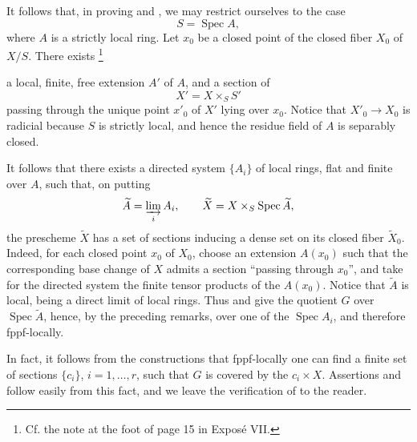 It follows that, in proving  and , we may
restrict ourselves to the case
\[
  S=\operatorname{Spec}A,
\]
where \(A\) is a strictly local ring. Let \(x_0\) be a closed
point of the closed fiber \(X_0\) of \(X/S\). There
exists\begingroup
\renewcommand{\thefootnote}{\ensuremath{\ast}}\footnote{Cf. the
note at the foot of page 15 in Exposé VII.}
\addtocounter{footnote}{-1}
\endgroup{} a local, finite, free extension \(A'\) of \(A\), and
a section of
\[
  X'=X\times_S S'
\]
passing through the unique point \(x'_0\) of \(X'\) lying over
\(x_0\). Notice that \(X'_0\to X_0\) is radicial because \(S\)
is strictly local, and hence the residue field of \(A\) is
separably closed.

It follows that there exists a directed system \(\{A_i\}\) of
local rings, flat and finite over \(A\), such that, on putting
\[
  \widetilde A=\varinjlim_i A_i,\qquad
  \widetilde X=X\times_S\operatorname{Spec}\widetilde A,
\]
the prescheme \(\widetilde X\) has a set of sections inducing a
dense set on its closed fiber \(\widetilde X_0\). Indeed, for
each closed point \(x_0\) of \(X_0\), choose an extension
\(A(x_0)\) such that the corresponding base change of \(X\)
admits a section ``passing through \(x_0\)'', and take for the
directed system the finite tensor products of the \(A(x_0)\).
Notice that \(\widetilde A\) is local, being a direct limit of
local rings. Thus  and  give the quotient \(G\)
over \(\operatorname{Spec}\widetilde A\), hence, by the preceding
remarks, over one of the \(\operatorname{Spec}A_i\), and therefore
fppf-locally.

In fact, it follows from the constructions that fppf-locally one
can find a finite set of sections
\(\{c_i\}\), \(i=1,\ldots,r\), such that \(G\) is covered by the
\(c_i\times X\). Assertions  and  follow easily from this
fact, and we leave the verification of  to the reader.

